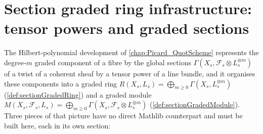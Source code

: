 \chapter{Section graded ring infrastructure: tensor powers and graded sections}
\label{chap:Picard_SectionGradedRing}

\providecommand{\PshMod}{\mathrm{PresheafOfModules}}
\providecommand{\ShMod}{\mathrm{SheafOfModules}}
\providecommand{\Modules}{\mathrm{Modules}}

The Hilbert-polynomial development of \cref{chap:Picard_QuotScheme} represents the
degree-\(m\) graded component of a fibre by the global sections
\(\Gamma(X_s, \mathcal{F}_s \otimes L_s^{\otimes m})\) of a twist of a coherent
sheaf by a tensor power of a line bundle, and it organises these components into
a graded ring \(R(X_s, L_s) = \bigoplus_{m \ge 0} \Gamma(X_s, L_s^{\otimes m})\)
(\cref{def:sectionGradedRing}) and a graded module
\(M(X_s, \mathcal{F}_s, L_s) = \bigoplus_{m \ge 0}
\Gamma(X_s, \mathcal{F}_s \otimes L_s^{\otimes m})\)
(\cref{def:sectionGradedModule}). Three pieces of that picture have no direct
Mathlib counterpart and must be built here, each in its own section:

